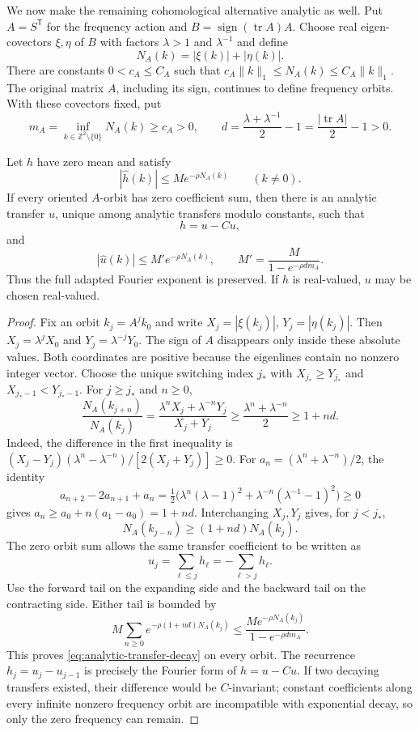 We now make the remaining cohomological alternative analytic as well.  Put
$A=S^{\mathsf T}$ for the frequency action and
$B=\operatorname{sign}(\operatorname{tr}A)A$.  Choose real eigen-covectors
$\xi,\eta$ of $B$ with factors $\lambda>1$ and $\lambda^{-1}$ and define
\[
 N_A(k)=|\xi(k)|+|\eta(k)|.
\]
There are constants $0<c_A\le C_A$ such that
$c_A\|k\|_1\le N_A(k)\le C_A\|k\|_1$.
The original matrix $A$, including its sign, continues to define frequency
orbits.  With these covectors fixed, put
\[
 m_A=\inf_{k\in\mathbb Z^2\setminus\{0\}}N_A(k)\ge c_A>0,
 \qquad d=\frac{\lambda+\lambda^{-1}}2-1
       =\frac{|\operatorname{tr}A|}2-1>0.
\]

\begin{theorem}
\label{thm:analytic-coboundary-regularity}
Let $h$ have zero mean and satisfy
\[
 |\widehat h(k)|\le M e^{-\rho N_A(k)}
 \qquad(k\ne0).
\]
If every oriented $A$-orbit has zero coefficient sum, then there is an analytic
transfer $u$, unique among analytic transfers modulo constants, such that
\[
 h=u-Cu,
\]
and
\begin{equation}\label{eq:analytic-transfer-decay}
 |\widehat u(k)|\le M' e^{-\rho N_A(k)},
 \qquad M'=\frac{M}{1-e^{-\rho d m_A}}.
\end{equation}
Thus the full adapted Fourier exponent is preserved.  If $h$ is real-valued,
$u$ may be chosen real-valued.
\end{theorem}
\begin{proof}
Fix an orbit $k_j=A^jk_0$ and write
$X_j=|\xi(k_j)|$, $Y_j=|\eta(k_j)|$.  Then
$X_j=\lambda^jX_0$ and $Y_j=\lambda^{-j}Y_0$.
The sign of $A$ disappears only inside these absolute values.  Both coordinates
are positive because the eigenlines contain no nonzero integer vector.
Choose the unique switching index $j_*$ with
$X_{j_*}\ge Y_{j_*}$ and $X_{j_*-1}<Y_{j_*-1}$.
For $j\ge j_*$ and $n\ge0$,
\[
 \frac{N_A(k_{j+n})}{N_A(k_j)}
 =\frac{\lambda^nX_j+\lambda^{-n}Y_j}{X_j+Y_j}
 \ge\frac{\lambda^n+\lambda^{-n}}2\ge1+nd.
\]
Indeed, the difference in the first inequality is
$(X_j-Y_j)(\lambda^n-\lambda^{-n})/[2(X_j+Y_j)]\ge0$.
For $a_n=(\lambda^n+\lambda^{-n})/2$, the identity
\[
 a_{n+2}-2a_{n+1}+a_n
 =\tfrac12\bigl(\lambda^n(\lambda-1)^2
       +\lambda^{-n}(\lambda^{-1}-1)^2\bigr)\ge0
\]
gives $a_n\ge a_0+n(a_1-a_0)=1+nd$.
Interchanging $X_j,Y_j$ gives, for $j<j_*$,
\[
 N_A(k_{j-n})\ge(1+nd)N_A(k_j).
\]
The zero orbit sum allows the same transfer coefficient to be written as
\[
 u_j=\sum_{\ell\le j}h_\ell=-\sum_{\ell>j}h_\ell.
\]
Use the forward tail on the expanding side and the backward tail on the
contracting side.  Either tail is bounded by
\[
 M\sum_{n\ge0}e^{-\rho(1+nd)N_A(k_j)}
 \le\frac{M e^{-\rho N_A(k_j)}}{1-e^{-\rho d m_A}}.
\]
This proves
\eqref{eq:analytic-transfer-decay} on every orbit.  The recurrence
$h_j=u_j-u_{j-1}$ is precisely the Fourier form of $h=u-Cu$.
If two decaying transfers existed, their difference would be $C$-invariant;
constant coefficients along every infinite nonzero frequency orbit are
incompatible with exponential decay, so only the zero frequency can remain.
\end{proof}

